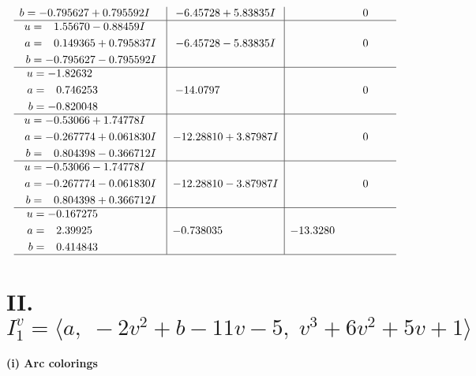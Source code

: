 \documentclass[1p]{elsarticle_modified}
\theoremstyle{definition}
\begin{document}
$$\begin{array}{c|c|c}
\begin{aligned}
b &= -0.795627 + 0.795592 I\end{aligned}
 & -6.45728 + 5.83835 I & \phantom{-0.000000 } 0 \\ \hline\begin{aligned}
u &= \phantom{-}1.55670 - 0.88459 I \\
a &= \phantom{-}0.149365 + 0.795837 I \\
b &= -0.795627 - 0.795592 I\end{aligned}
 & -6.45728 - 5.83835 I & \phantom{-0.000000 } 0 \\ \hline\begin{aligned}
u &= -1.82632\phantom{ +0.000000I} \\
a &= \phantom{-}0.746253\phantom{ +0.000000I} \\
b &= -0.820048\phantom{ +0.000000I}\end{aligned}
 & -14.0797\phantom{ +0.000000I} & \phantom{-0.000000 } 0 \\ \hline\begin{aligned}
u &= -0.53066 + 1.74778 I \\
a &= -0.267774 + 0.061830 I \\
b &= \phantom{-}0.804398 - 0.366712 I\end{aligned}
 & -12.28810 + 3.87987 I & \phantom{-0.000000 } 0 \\ \hline\begin{aligned}
u &= -0.53066 - 1.74778 I \\
a &= -0.267774 - 0.061830 I \\
b &= \phantom{-}0.804398 + 0.366712 I\end{aligned}
 & -12.28810 - 3.87987 I & \phantom{-0.000000 } 0 \\ \hline\begin{aligned}
u &= -0.167275\phantom{ +0.000000I} \\
a &= \phantom{-}2.39925\phantom{ +0.000000I} \\
b &= \phantom{-}0.414843\phantom{ +0.000000I}\end{aligned}
 & -0.738035\phantom{ +0.000000I} & -13.3280\phantom{ +0.000000I}\\
 \hline 
 \end{array}$$\newpage\newpage\renewcommand{\arraystretch}{1}
\centering \section*{II. $I^v_{1}= \langle a,\;-2 v^2+b-11 v-5,\;v^3+6 v^2+5 v+1 \rangle$}
\flushleft \textbf{(i) Arc colorings}\\
\end{document}
